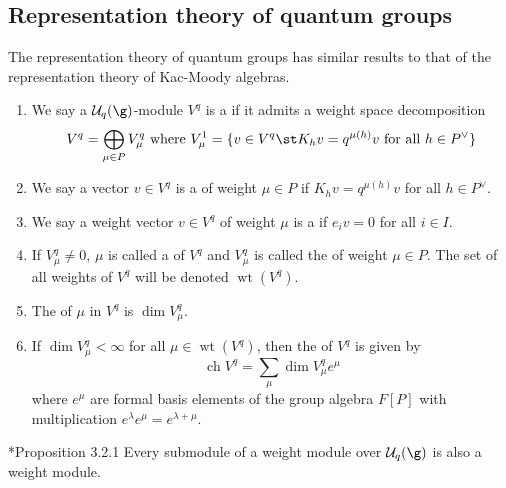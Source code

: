 \documentclass[11pt,leqno,oneside]{amsart}
\numberwithin{thm}{section}
\newcommand{\weightlattice}{P}
\newcommand{\U}{\mathcal{U}}
\newcommand{\ch}{\operatorname{ch}}
\DeclareMathOperator{\wt}{wt}
\begin{document}
\subsection{Representation theory of quantum groups}
The representation theory of quantum groups has similar results to
that of the representation theory of Kac-Moody algebras. 
\begin{defn}
  \begin{enumerate}
  \item  We say a \(\U_q(\g)\)-module \(V^q\) is a  if it
  admits a weight space decomposition \[
    V^q = \bigoplus_{\mu \in \weightlattice} V_\mu^q \text{ where }
    V_\mu^1 = \{v \in V^q \st K_h v = q^{\mu(h)} v \text{ for all }h
    \in \weightlattice^\vee\}
  \]
  \item We say a vector \(v \in V^q\) is a 
    of weight \(\mu \in \weightlattice\) if \(K_h v = q^{\mu(h)} v\)
    for all \(h \in \weightlattice^\vee\).
  \item We say a weight vector \(v \in V^q\) of weight \(\mu\) is a
     if \(e_i v = 0\) for
    all \(i \in I\).
  \item If \(V_\mu^q \neq 0\), \(\mu\) is called a  of
    \(V^q\) and \(V_\mu^q\) is called the  of weight
    \(\mu \in \weightlattice\). The set of all weights of \(V^q\) will
    be denoted \(\wt(V^q)\).
  \item The  of \(\mu\) in \(V^q\) is \(\dim
    V_\mu^q\).
  \item If \(\dim V^q_\mu < \infty\) for all \(\mu \in \wt(V^q)\),
    then the  of \(V^q\) is given by \[
      \ch V^q = \sum_\mu \dim V^q_\mu e^\mu
    \]
    where \(e^\mu\) are formal basis elements of the group algebra
    \(F[\weightlattice]\) with multiplication \(e^\lambda e^\mu =
    e^{\lambda + \mu}\).
  \end{enumerate}
\end{defn}
\begin{prop}
  \cite{hong-kang}*{Proposition 3.2.1} Every submodule of a weight
  module over \(\U_q(\g)\) is also a 
  weight module.
\end{prop}
\end{document}
